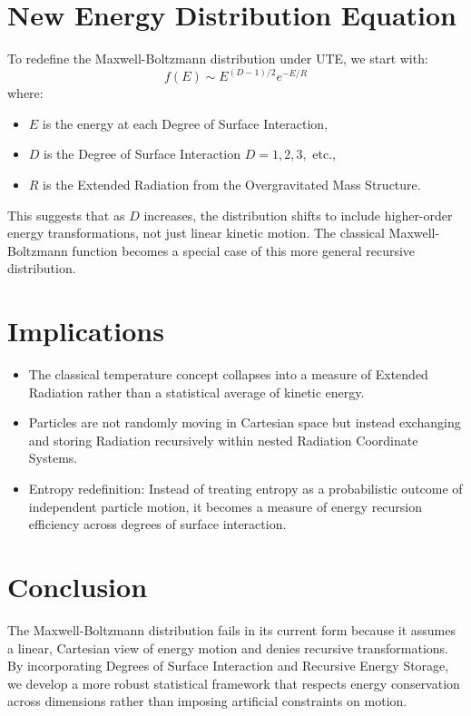 \documentclass{article}
\begin{document}
\section{New Energy Distribution Equation}

To redefine the Maxwell-Boltzmann distribution under UTE, we start with:
\begin{equation}
    f(E) \sim E^{(D-1)/2} e^{-E/R}
\end{equation}
where:
\begin{itemize}
    \item \( E \) is the energy at each Degree of Surface Interaction,
    \item \( D \) is the Degree of Surface Interaction \( D=1,2,3, \) etc.,
    \item \( R \) is the Extended Radiation from the Overgravitated Mass Structure.
\end{itemize}
This suggests that as \( D \) increases, the distribution shifts to include higher-order energy transformations, not just linear kinetic motion. The classical Maxwell-Boltzmann function becomes a special case of this more general recursive distribution.

\section{Implications}

\begin{itemize}
    \item The classical temperature concept collapses into a measure of Extended Radiation rather than a statistical average of kinetic energy.
    \item Particles are not randomly moving in Cartesian space but instead exchanging and storing Radiation recursively within nested Radiation Coordinate Systems.
    \item Entropy redefinition: Instead of treating entropy as a probabilistic outcome of independent particle motion, it becomes a measure of energy recursion efficiency across degrees of surface interaction.
\end{itemize}

\section{Conclusion}

The Maxwell-Boltzmann distribution fails in its current form because it assumes a linear, Cartesian view of energy motion and denies recursive transformations. By incorporating Degrees of Surface Interaction and Recursive Energy Storage, we develop a more robust statistical framework that respects energy conservation across dimensions rather than imposing artificial constraints on motion.
\end{document}
